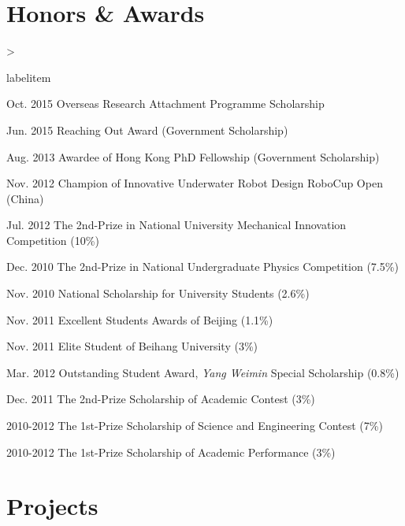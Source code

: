 \documentclass[10pt,letterpaper]{article}
\makeatletter
\newenvironment{dateitemize}%
{\ifnum \@itemdepth >\thr@@\@toodeep\else
  \advance\@itemdepth\@ne
  \edef\@itemitem{labelitem\romannumeral\the\@itemdepth}%
  \expandafter
  \list
  \csname\@itemitem\endcsname
  {\advance\rightmargin3cm
    \def\makelabel##1{\hss\llap{\textbullet}\rlap{\hbox to \dimexpr\linewidth+\rightmargin+\itemsep\relax{\hss##1}}}}%
  \fi}
{\endlist}%
\makeatother
\begin{document}
\section*{Honors \& Awards}

\begin{dateitemize}
  \item[Oct. 2015] Overseas Research Attachment Programme Scholarship
  \item[Jun. 2015] Reaching Out Award (Government Scholarship)
  \item[Aug. 2013] Awardee of Hong Kong PhD Fellowship (Government Scholarship)
  \item[Nov. 2012] Champion of Innovative Underwater Robot Design RoboCup Open (China)
  \item[Jul. 2012] The 2nd-Prize in National University Mechanical Innovation Competition (10\%)
  \item[Dec. 2010] The 2nd-Prize in National Undergraduate Physics Competition (7.5\%)
  \item[Nov. 2010] National Scholarship for University Students (2.6\%)
  \item[Nov. 2011] Excellent Students Awards of Beijing (1.1\%)
  \item[Nov. 2011] Elite Student of Beihang University (3\%)
  \item[Mar. 2012] Outstanding Student Award, \textit{Yang Weimin} Special Scholarship (0.8\%)
  \item[Dec. 2011] The 2nd-Prize Scholarship of Academic Contest (3\%)
  \item[2010-2012] The 1st-Prize Scholarship of Science and Engineering Contest (7\%)
  \item[2010-2012] The 1st-Prize Scholarship of Academic Performance (3\%)

\end{dateitemize}

\section*{Projects}
\end{document}
